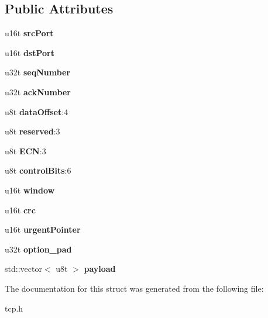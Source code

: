 \subsection*{Public Attributes}
\begin{DoxyCompactItemize}
\item 
\mbox{\label{structtcp__header__t_ab17e30c5b73eda905376cffc6e96b27e}} 
u16t {\bfseries src\+Port}
\item 
\mbox{\label{structtcp__header__t_aa1637617627d696a0d00b7db9a0c3e05}} 
u16t {\bfseries dst\+Port}
\item 
\mbox{\label{structtcp__header__t_acd373805c52a50636660a35adfbd6730}} 
u32t {\bfseries seq\+Number}
\item 
\mbox{\label{structtcp__header__t_a16a113bd0f6979ce68293292cd2a9434}} 
u32t {\bfseries ack\+Number}
\item 
\mbox{\label{structtcp__header__t_a85a41a2af5b99f168ab4521a19230eda}} 
u8t {\bfseries data\+Offset}\+:4
\item 
\mbox{\label{structtcp__header__t_a0ecad51922d8f16d7c260bc6979548d4}} 
u8t {\bfseries reserved}\+:3
\item 
\mbox{\label{structtcp__header__t_a93d31f86f389129044eb25ddf8d6c776}} 
u8t {\bfseries E\+CN}\+:3
\item 
\mbox{\label{structtcp__header__t_a68fe920f9ea75e505ffaae2c2f459643}} 
u8t {\bfseries control\+Bits}\+:6
\item 
\mbox{\label{structtcp__header__t_a3dab5b7dabccaad92e62208b4bea4f31}} 
u16t {\bfseries window}
\item 
\mbox{\label{structtcp__header__t_a77f30d1156bb756a032d22ddf7da68be}} 
u16t {\bfseries crc}
\item 
\mbox{\label{structtcp__header__t_a276b80e1695467a2e1e0042e2007bb6e}} 
u16t {\bfseries urgent\+Pointer}
\item 
\mbox{\label{structtcp__header__t_aa0942cb51895cd56edbf6e7c38ac001c}} 
u32t {\bfseries option\+\_\+pad}
\item 
\mbox{\label{structtcp__header__t_a21fd2ea47b4350e682d309ce6aa8c311}} 
std\+::vector$<$ u8t $>$ {\bfseries payload}
\end{DoxyCompactItemize}


The documentation for this struct was generated from the following file\+:\begin{DoxyCompactItemize}
\item 
tcp.\+h\end{DoxyCompactItemize}

